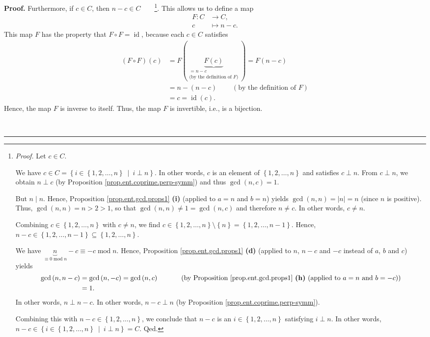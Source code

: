 \documentclass[numbers=enddot,12pt,final,onecolumn,notitlepage]{scrartcl}%
\numberwithin{exer}{subsection}
\theoremstyle{definition}
\newenvironment{fineprint}{\begin{small}}{\end{small}}
\newenvironment{proof}[1][Proof]{\noindent\textbf{#1.} }{\ \rule{0.5em}{0.5em}}
\begin{document}
\begin{fineprint}
\begin{proof}
Furthermore, if $c\in C$, then $n-c\in C$\ \ \ \ \footnote{\textit{Proof.} Let
$c\in C$.
\par
We have $c\in C=\left\{  i\in\left\{  1,2,\ldots,n\right\}  \ \mid\ i\perp
n\right\}  $. In other words, $c$ is an element of $\left\{  1,2,\ldots
,n\right\}  $ and satisfies $c\perp n$. From $c\perp n$, we obtain $n\perp c$
(by Proposition \ref{prop.ent.coprime.perp-symm}) and thus $\gcd\left(
n,c\right)  =1$.
\par
But $n\mid n$. Hence, Proposition \ref{prop.ent.gcd.props1} \textbf{(i)}
(applied to $a=n$ and $b=n$) yields $\gcd\left(  n,n\right)  =\left\vert
n\right\vert =n$ (since $n$ is positive). Thus, $\gcd\left(  n,n\right)
=n>2>1$, so that $\gcd\left(  n,n\right)  \neq1=\gcd\left(  n,c\right)  $ and
therefore $n\neq c$. In other words, $c\neq n$.
\par
Combining $c\in\left\{  1,2,\ldots,n\right\}  $ with $c\neq n$, we find
$c\in\left\{  1,2,\ldots,n\right\}  \setminus\left\{  n\right\}  =\left\{
1,2,\ldots,n-1\right\}  $. Hence, $n-c\in\left\{  1,2,\ldots,n-1\right\}
\subseteq\left\{  1,2,\ldots,n\right\}  $.
\par
We have $\underbrace{n}_{\equiv0\operatorname{mod}n}-c\equiv
-c\operatorname{mod}n$. Hence, Proposition \ref{prop.ent.gcd.props1}
\textbf{(d)} (applied to $n$, $n-c$ and $-c$ instead of $a$, $b$ and $c$)
yields
\begin{align*}
\gcd\left(  n,n-c\right)   &  =\gcd\left(  n,-c\right)  =\gcd\left(
n,c\right)  \ \ \ \ \ \ \ \ \ \ \left(  \text{by Proposition
\ref{prop.ent.gcd.props1} \textbf{(h)} (applied to }a=n\text{ and
}b=-c\text{)}\right) \\
&  =1.
\end{align*}
In other words, $n\perp n-c$. In other words, $n-c\perp n$ (by Proposition
\ref{prop.ent.coprime.perp-symm}).
\par
Combining this with $n-c\in\left\{  1,2,\ldots,n\right\}  $, we conclude that
$n-c$ is an $i\in\left\{  1,2,\ldots,n\right\}  $ satisfying $i\perp n$. In
other words, $n-c\in\left\{  i\in\left\{  1,2,\ldots,n\right\}  \ \mid\ i\perp
n\right\}  =C$. Qed.}. This allows us to define a map%
\begin{align*}
F:C  &  \rightarrow C,\\
c  &  \mapsto n-c.
\end{align*}
This map $F$ has the property that $F\circ F=\operatorname*{id}$, because each
$c\in C$ satisfies%
\begin{align*}
\left(  F\circ F\right)  \left(  c\right)   &  =F\left(  \underbrace{F\left(
c\right)  }_{\substack{=n-c\\\text{(by the definition of }F\text{)}}}\right)
=F\left(  n-c\right) \\
&  =n-\left(  n-c\right)  \ \ \ \ \ \ \ \ \ \ \left(  \text{by the definition
of }F\right) \\
&  =c=\operatorname*{id}\left(  c\right)  .
\end{align*}
Hence, the map $F$ is inverse to itself. Thus, the map $F$ is invertible,
i.e., is a bijection.


\end{proof}
\end{fineprint}
\end{document}
